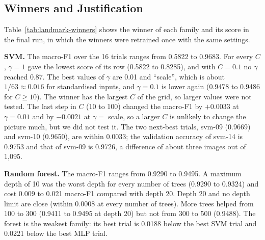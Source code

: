 \subsection{Winners and Justification}

Table~\ref{tab:landmark-winners} shows the winner of each family and its score in the final run, in which the winners were retrained once with the same settings.

\begin{table}[htbp]
\centering
\caption{Winning trial per family. Search scores are validation scores from the trials file; the last column is the validation macro-F1 of the retrained model in the final run.}
\label{tab:landmark-winners}
\end{table}

\textbf{SVM.} The macro-F1 over the 16 trials ranges from 0.5822 to 0.9683. For every $C$, $\gamma=1$ gave the lowest score of its row (0.5822 to 0.8285), and with $C=0.1$ no $\gamma$ reached 0.87. The best values of $\gamma$ are 0.01 and ``scale'', which is about $1/63\approx0.016$ for standardised inputs, and $\gamma=0.1$ is lower again (0.9478 to 0.9486 for $C\geq10$). The winner has the largest $C$ of the grid, so larger values were not tested. The last step in $C$ (10 to 100) changed the macro-F1 by $+0.0033$ at $\gamma=0.01$ and by $-0.0021$ at $\gamma=$ scale, so a larger $C$ is unlikely to change the picture much, but we did not test it. The two next-best trials, svm-09 (0.9669) and svm-10 (0.9650), are within 0.0033; the validation accuracy of svm-14 is 0.9753 and that of svm-09 is 0.9726, a difference of about three images out of 1{,}095.

\textbf{Random forest.} The macro-F1 ranges from 0.9290 to 0.9495. A maximum depth of 10 was the worst depth for every number of trees (0.9290 to 0.9324) and cost 0.009 to 0.021 macro-F1 compared with depth 20. Depth 20 and no depth limit are close (within 0.0008 at every number of trees). More trees helped from 100 to 300 (0.9411 to 0.9495 at depth 20) but not from 300 to 500 (0.9488). The forest is the weakest family: its best trial is 0.0188 below the best SVM trial and 0.0221 below the best MLP trial.

